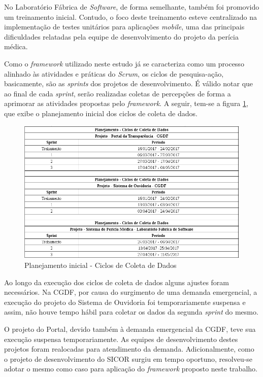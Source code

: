 No Laboratório Fábrica de \textit{Software}, de forma semelhante, também foi promovido um treinamento inicial. Contudo, o foco deste treinamento esteve centralizado na implementação de testes unitários para aplicações \textit{mobile}, uma das principais dificuldades relatadas pela equipe de desenvolvimento do projeto da perícia médica.

Como o \textit{framework} utilizado neste estudo já se caracteriza como um processo alinhado às atividades e práticas do \textit{Scrum}, os ciclos de pesquisa-ação, basicamente, são as \textit{sprints} dos projetos de desenvolvimento. É válido notar que ao final de cada \textit{sprint}, serão realizadas coletas de percepções de forma a aprimorar as atividades propostas pelo \textit{framework}. A seguir, tem-se a figura \ref{fig:planejamento1}, que exibe o planejamento inicial dos ciclos de coleta de dados.

\begin{figure}[h]
\includegraphics[width=\textwidth]{figuras/planejamento.png}
\caption{Planejamento inicial - Ciclos de Coleta de Dados}
\label{fig:planejamento1}
\end{figure}

Ao longo da execução dos ciclos de coleta de dados alguns ajustes foram necessários. Na CGDF, por causa do surgimento de uma demanda emergencial, a execução do projeto do Sistema de Ouvidoria foi temporariamente suspensa e assim, não houve tempo hábil para coletar os dados da segunda \textit{sprint} do mesmo.

O projeto do Portal, devido também à demanda emergencial da CGDF, teve sua execução suspensa temporariamente. As equipes de desenvolvimento destes projetos foram realocadas para atendimento da demanda. Adicionalmente, como o projeto de desenvolvimento do SICOR surgiu em tempo oportuno, resolveu-se adotar o mesmo como caso para aplicação do \textit{framework} proposto neste trabalho.

